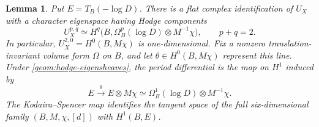 \documentclass[11pt]{amsart}
\newtheorem{lemma}[theorem]{Lemma}
\theoremstyle{definition}
\theoremstyle{remark}
\numberwithin{equation}{section}
\begin{document}
\begin{lemma}\label{geom:twisted-hodge}
Put $E=T_B(-\log D)$.  There is a flat complex identification of
$U_X$ with a character eigenspace having Hodge components
\begin{equation}\label{geom:hodge-eigensheaves}
 U_X^{p,q}\simeq
 H^q\bigl(B,\Omega_B^p(\log D)\otimes M^{-1}\chi\bigr),
 \qquad p+q=2.
\end{equation}
In particular, $U_X^{2,0}=H^0(B,M\chi)$ is one-dimensional.
Fix a nonzero translation-invariant volume form $\Omega$ on $B$, and let
$\theta\in H^0(B,M\chi)$ represent this line.  Under
\eqref{geom:hodge-eigensheaves}, the period differential is the map
on $H^1$ induced by
\begin{equation}\label{geom:derivative}
 E\xrightarrow{\ \theta\ }E\otimes M\chi
       \simeq\Omega_B^1(\log D)\otimes M^{-1}\chi.
\end{equation}
The Kodaira--Spencer map identifies the tangent space of the full
six-dimensional family $(B,M,\chi,[d])$ with $H^1(B,E)$.
\end{lemma}
\end{document}
